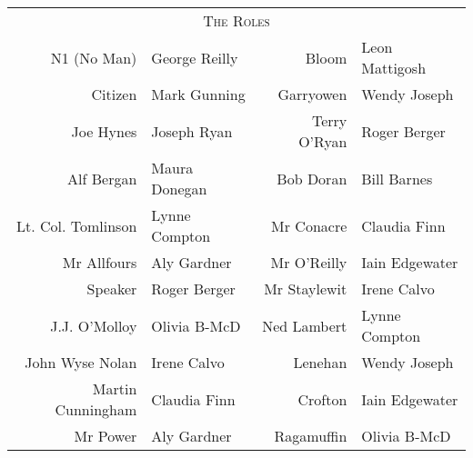 \begin{tabular}{rlrl}
    \multicolumn{4}{c}{\Large \textsc{The Roles}} \\
N1 (No Man)         & George Reilly &       %
Bloom               & Leon Mattigosh \\     %

Citizen             & Mark Gunning &        %
Garryowen           & Wendy Joseph \\       %

Joe Hynes           & Joseph Ryan &         %
Terry O'Ryan        & Roger Berger \\       %

Alf Bergan          & Maura Donegan &       %
Bob Doran           & Bill Barnes \\        %

Lt. Col. Tomlinson  & Lynne Compton &       %
Mr Conacre          & Claudia Finn \\       %

Mr Allfours         & Aly Gardner &         %
Mr O'Reilly         & Iain Edgewater \\     %

Speaker             & Roger Berger &        %
Mr Staylewit        & Irene Calvo \\        %

J.J. O'Molloy       & Olivia B-McD &  %
Ned Lambert         & Lynne Compton \\      %

John Wyse Nolan     & Irene Calvo &         %
Lenehan             & Wendy Joseph \\       %

Martin Cunningham   & Claudia Finn &        %
Crofton             & Iain Edgewater \\     %

Mr Power            & Aly Gardner &         %
Ragamuffin          & Olivia B-McD \\  %
\end{tabular}

